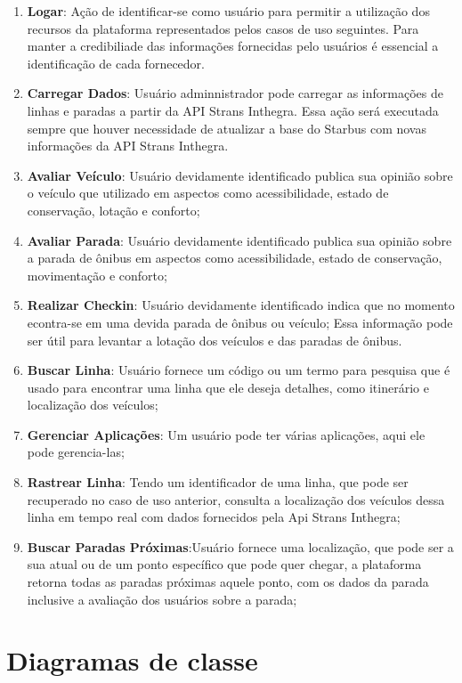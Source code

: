 \begin{enumerate}
  \item \textbf{Logar}: Ação de identificar-se como usuário para permitir a utilização dos recursos 
  da plataforma representados pelos casos de uso seguintes. Para manter a credibiliade das 
  informações fornecidas pelo usuários é essencial a identificação de cada fornecedor.  
  \item \textbf{Carregar Dados}: Usuário adminnistrador pode carregar as informações de linhas 
  e paradas a partir da API Strans Inthegra. Essa ação será executada sempre que houver 
  necessidade de atualizar a base do Starbus com novas informações da API Strans Inthegra.
  \item \textbf{Avaliar Veículo}: Usuário devidamente identificado publica sua opinião sobre 
  o veículo que utilizado em aspectos como acessibilidade, estado de conservação, lotação e conforto;
  \item \textbf{Avaliar Parada}: Usuário devidamente identificado publica sua opinião sobre 
  a parada de ônibus em aspectos como acessibilidade, estado de conservação, movimentação e 
  conforto;
  \item \textbf{Realizar Checkin}: Usuário devidamente identificado indica que no momento 
  econtra-se em uma devida parada de ônibus ou veículo; Essa informação pode ser útil para levantar
  a lotação dos veículos e das paradas de ônibus.  
  \item \textbf{Buscar Linha}: Usuário fornece um código ou um termo para pesquisa que é usado 
  para encontrar uma linha que ele deseja detalhes, como itinerário e localização dos veículos;
  \item \textbf{Gerenciar Aplicações}: Um usuário pode ter várias aplicações, aqui ele pode gerencia-las;
  \item \textbf{Rastrear Linha}: Tendo um identificador de uma linha, que pode ser recuperado 
  no caso de uso anterior, consulta a localização dos veículos dessa linha em tempo real com dados 
  fornecidos pela Api Strans Inthegra;
  \item \textbf{Buscar Paradas Próximas}:Usuário fornece uma localização, que pode ser a sua atual 
  ou de um ponto específico que pode quer chegar, a plataforma retorna todas as paradas próximas 
  aquele ponto, com os dados da parada inclusive a avaliação dos usuários sobre a parada;
\end{enumerate}

\section{Diagramas de classe} \label{sec:modelagem:classe}

